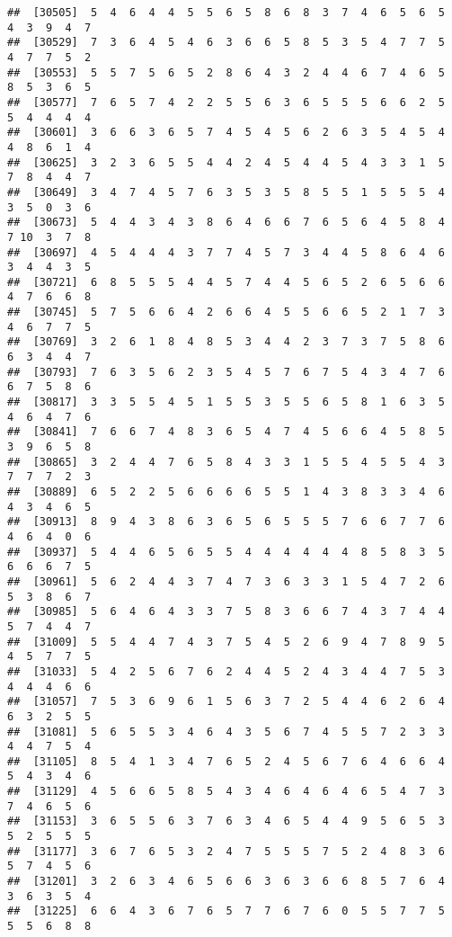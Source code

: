 \documentclass[
]{book}
\begin{document}
\begin{verbatim}
##  [30505]  5  4  6  4  4  5  5  6  5  8  6  8  3  7  4  6  5  6  5  4  3  9  4  7
##  [30529]  7  3  6  4  5  4  6  3  6  6  5  8  5  3  5  4  7  7  5  4  7  7  5  2
##  [30553]  5  5  7  5  6  5  2  8  6  4  3  2  4  4  6  7  4  6  5  8  5  3  6  5
##  [30577]  7  6  5  7  4  2  2  5  5  6  3  6  5  5  5  6  6  2  5  5  4  4  4  4
##  [30601]  3  6  6  3  6  5  7  4  5  4  5  6  2  6  3  5  4  5  4  4  8  6  1  4
##  [30625]  3  2  3  6  5  5  4  4  2  4  5  4  4  5  4  3  3  1  5  7  8  4  4  7
##  [30649]  3  4  7  4  5  7  6  3  5  3  5  8  5  5  1  5  5  5  4  3  5  0  3  6
##  [30673]  5  4  4  3  4  3  8  6  4  6  6  7  6  5  6  4  5  8  4  7 10  3  7  8
##  [30697]  4  5  4  4  4  3  7  7  4  5  7  3  4  4  5  8  6  4  6  3  4  4  3  5
##  [30721]  6  8  5  5  5  4  4  5  7  4  4  5  6  5  2  6  5  6  6  4  7  6  6  8
##  [30745]  5  7  5  6  6  4  2  6  6  4  5  5  6  6  5  2  1  7  3  4  6  7  7  5
##  [30769]  3  2  6  1  8  4  8  5  3  4  4  2  3  7  3  7  5  8  6  6  3  4  4  7
##  [30793]  7  6  3  5  6  2  3  5  4  5  7  6  7  5  4  3  4  7  6  6  7  5  8  6
##  [30817]  3  3  5  5  4  5  1  5  5  3  5  5  6  5  8  1  6  3  5  4  6  4  7  6
##  [30841]  7  6  6  7  4  8  3  6  5  4  7  4  5  6  6  4  5  8  5  3  9  6  5  8
##  [30865]  3  2  4  4  7  6  5  8  4  3  3  1  5  5  4  5  5  4  3  7  7  7  2  3
##  [30889]  6  5  2  2  5  6  6  6  6  5  5  1  4  3  8  3  3  4  6  4  3  4  6  5
##  [30913]  8  9  4  3  8  6  3  6  5  6  5  5  5  7  6  6  7  7  6  4  6  4  0  6
##  [30937]  5  4  4  6  5  6  5  5  4  4  4  4  4  4  8  5  8  3  5  6  6  6  7  5
##  [30961]  5  6  2  4  4  3  7  4  7  3  6  3  3  1  5  4  7  2  6  5  3  8  6  7
##  [30985]  5  6  4  6  4  3  3  7  5  8  3  6  6  7  4  3  7  4  4  5  7  4  4  7
##  [31009]  5  5  4  4  7  4  3  7  5  4  5  2  6  9  4  7  8  9  5  4  5  7  7  5
##  [31033]  5  4  2  5  6  7  6  2  4  4  5  2  4  3  4  4  7  5  3  4  4  4  6  6
##  [31057]  7  5  3  6  9  6  1  5  6  3  7  2  5  4  4  6  2  6  4  6  3  2  5  5
##  [31081]  5  6  5  5  3  4  6  4  3  5  6  7  4  5  5  7  2  3  3  4  4  7  5  4
##  [31105]  8  5  4  1  3  4  7  6  5  2  4  5  6  7  6  4  6  6  4  5  4  3  4  6
##  [31129]  4  5  6  6  5  8  5  4  3  4  6  4  6  4  6  5  4  7  3  7  4  6  5  6
##  [31153]  3  6  5  5  6  3  7  6  3  4  6  5  4  4  9  5  6  5  3  5  2  5  5  5
##  [31177]  3  6  7  6  5  3  2  4  7  5  5  5  7  5  2  4  8  3  6  5  7  4  5  6
##  [31201]  3  2  6  3  4  6  5  6  6  3  6  3  6  6  8  5  7  6  4  3  6  3  5  4
##  [31225]  6  6  4  3  6  7  6  5  7  7  6  7  6  0  5  5  7  7  5  5  5  6  8  8

\end{verbatim}
\end{document}
